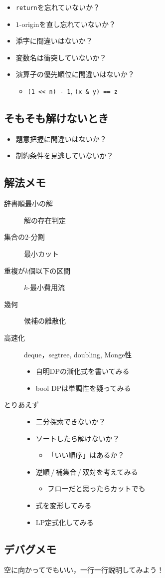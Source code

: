 \documentclass{jsarticle}
\begin{document}
\begin{itemize}
\item \verb|return|を忘れていないか？
\item $1$-originを直し忘れていないか？
\item 添字に間違いはないか？
\item 変数名は衝突していないか？
\item 演算子の優先順位に間違いはないか？
  \begin{itemize}
  \item \verb|(1 << n) - 1|, \verb|(x & y) == z|
  \end{itemize}
\end{itemize}

\subsection*{そもそも解けないとき}

\begin{itemize}
\item 題意把握に間違いはないか？
\item 制約条件を見逃していないか？
\end{itemize}

\subsection*{解法メモ}

\begin{description}
\item[辞書順最小の解] 解の存在判定
\item[集合の$2$-分割] 最小カット
\item[重複が$k$個以下の区間] $k$-最小費用流
\item[幾何] 候補の離散化
\item[高速化] deque，segtree, doubling, Monge性
  \begin{itemize}
  \item 自明DPの漸化式を書いてみる
  \item bool DPは単調性を疑ってみる
  \end{itemize}
\item[とりあえず]\mbox{}
  \begin{itemize}
  \item 二分探索できないか？
  \item ソートしたら解けないか？
    \begin{itemize}
    \item 「いい順序」はあるか？
    \end{itemize}
  \item 逆順\,/\,補集合\,/\,双対を考えてみる
    \begin{itemize}
    \item フローだと思ったらカットでも
    \end{itemize}
  \item 式を変形してみる
  \item LP定式化してみる
  \end{itemize}
\end{description}

\subsection*{デバグメモ}

空に向かってでもいい，一行一行説明してみよう！
\end{document}
